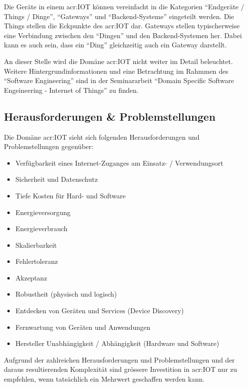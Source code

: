 Die Geräte in einem \gls{acr:IOT} können vereinfacht in die Kategorien "`Endgeräte / Things / Dinge"', "`Gateways"' und "`Backend-Systeme"' eingeteilt werden. Die Things stellen die Eckpunkte des \gls{acr:IOT} dar. Gateways stellen typischerweise eine Verbindung zwischen den "`Dingen"' und den Backend-Systemen her. Dabei kann es auch sein, dass ein "`Ding"' gleichzeitig auch ein Gateway darstellt.

An dieser Stelle wird die Domäne \gls{acr:IOT} nicht weiter im Detail beleuchtet. Weitere Hintergrundinformationen und eine Betrachtung im Rahmmen des "`Software Engineering"' sind in der Seminararbeit "`Domain Specific Software Engeineering - Internet of Things"' \cite{E:DBRU:SEM:IOT} zu finden.

\subsection{Herausforderungen \& Problemstellungen}\label{sec:AnalyseIot:ChallangesAndProblems}
Die Domäne \gls{acr:IOT} sieht sich folgenden Herausforderungen und Problemstellungen gegenüber:

\begin{itemize}
\item Verfügbarkeit eines Internet-Zuganges am Einsatz- / Verwendungsort
\item Sicherheit und Datenschutz
\item Tiefe Kosten für Hard- und Software
\item Energieversorgung
\item Energieverbrauch
\item Skalierbarkeit
\item Fehlertoleranz
\item Akzeptanz
\item Robustheit (physisch und logisch)
\item Entdecken von Geräten und Services (Device Discovery)
\item Fernwartung von Geräten und Anwendungen
\item Hersteller Unabhängigkeit / Abhängigkeit (Hardware und Software)
\end{itemize}

Aufgrund der zahlreichen Herausforderungen und Problemstellungen und der daraus resultierenden Komplexität sind grössere Investition in \gls{acr:IOT} nur zu empfehlen, wenn tatsächlich ein Mehrwert geschaffen werden kann.
\newpage

